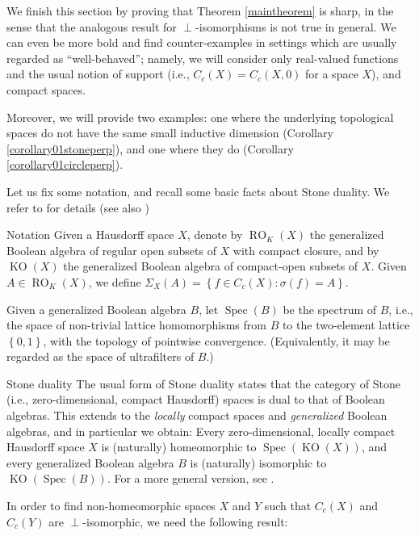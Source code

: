 \documentclass[letter,11pt]{amsart}
\theoremstyle{plain}		\newtheorem{theorem}[generalnumbering]{Theorem}
\theoremstyle{plain}		\newtheorem{corollary}[generalnumbering]{Corollary}
\theoremstyle{definition}		\newtheorem{definition}[generalnumbering]{Definition}
\theoremstyle{definition}		\newtheorem{example}[generalnumbering]{Example}
\theoremstyle{plain}		\newtheorem{proposition}[generalnumbering]{Proposition}
\theoremstyle{plain}		\newtheorem{lemma}[generalnumbering]{Lemma}
\theoremstyle{plain}    \newtheorem{plainstyle}[generalnumbering]{\namefordifferentenvironment}
\theoremstyle{plain}    \newtheorem*{plainstyle*}{\namefordifferentenvironment}
\theoremstyle{definition}    \newtheorem{definitionstyle}[generalnumbering]{\namefordifferentenvironment}
\theoremstyle{definition}    \newtheorem*{definitionstyle*}{\namefordifferentenvironment}
\newcommand{\namefordifferentenvironment}{}
\newenvironment{denv*}[1]{\renewcommand{\namefordifferentenvironment}{#1}\begin{definitionstyle*}}{\end{definitionstyle*}}
\begin{document}
We finish this section by proving that Theorem \ref{maintheorem} is sharp, in the sense that the analogous result for $\perp$-isomorphisms is not true in general. We can even be more bold and find counter-examples in settings which are usually regarded as ``well-behaved''; namely, we will consider only real-valued functions and the usual notion of support (i.e., $C_c(X)=C_c(X,0)$ for a space $X$), and compact spaces.

Moreover, we will provide two examples: one where the underlying topological spaces do not have the same small inductive dimension (Corollary \ref{corollary01stoneperp}), and one where they do (Corollary \ref{corollary01circleperp}).

Let us fix some notation, and recall some basic facts about Stone duality. We refer to \cite{MR1507106,dml124080} for details (see also \cite[II.4.4]{MR861951})

\begin{denv*}{Notation}
	Given a Hausdorff space $X$, denote by $\operatorname{RO}_K(X)$ the generalized Boolean algebra of regular open subsets of $X$ with compact closure, and by $\operatorname{KO}(X)$ the generalized Boolean algebra of compact-open subsets of $X$. Given $A\in \operatorname{RO}_K(X)$, we define $\Sigma_X(A)=\left\{f\in C_c(X):\sigma(f)=A\right\}$.
	
	Given a generalized Boolean algebra $B$, let $\operatorname{Spec}(B)$ be the spectrum of $B$, i.e., the space of non-trivial lattice homomorphisms from $B$ to the two-element lattice $\left\{0,1\right\}$, with the topology of pointwise convergence. (Equivalently, it may be regarded as the space of ultrafilters of $B$.)
\end{denv*}

\begin{denv*}{Stone duality}
	The usual form of Stone duality states that the category of Stone (i.e., zero-dimensional, compact Hausdorff) spaces is dual to that of Boolean algebras. This extends to the \emph{locally} compact spaces and \emph{generalized} Boolean algebras, and in particular we obtain: Every zero-dimensional, locally compact Hausdorff space $X$ is (naturally) homeomorphic to $\operatorname{Spec}(\operatorname{KO}(X))$, and every generalized Boolean algebra $B$ is (naturally) isomorphic to $\operatorname{KO}(\operatorname{Spec}(B))$. For a more general version, see \cite{bicestarlinglcsd}.
\end{denv*}

In order to find non-homeomorphic spaces $X$ and $Y$ such that $C_c(X)$ and $C_c(Y)$ are $\perp$-isomorphic, we need the following result:
\end{document}
